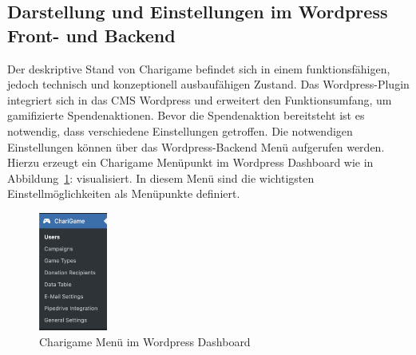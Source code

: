 \subsection{Darstellung und Einstellungen im Wordpress Front- und Backend}
Der deskriptive Stand von Charigame befindet sich in einem funktionsfähigen, jedoch technisch und konzeptionell ausbaufähigen Zustand.
Das Wordpress-Plugin integriert sich in das CMS Wordpress und erweitert den Funktionsumfang, um gamifizierte Spendenaktionen.
Bevor die Spendenaktion bereitsteht ist es notwendig, dass verschiedene Einstellungen getroffen.
Die notwendigen Einstellungen können über das Wordpress-Backend Menü aufgerufen werden.
\\
Hierzu erzeugt ein Charigame Menüpunkt im Wordpress Dashboard wie in Abbildung~\ref{fig:charigame-menu-legacy}: visualisiert.
In diesem Menü sind die wichtigsten Einstellmöglichkeiten als Menüpunkte definiert.
\begin{figure}[tbh]
    \centering
    \includegraphics[width=0.2\textwidth]{images/legacy_charigame_wordpress_menu}
    \caption{Charigame Menü im Wordpress Dashboard}
    \label{fig:charigame-menu-legacy}
\end{figure}

